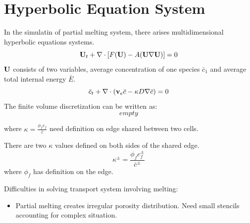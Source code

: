 \section{Hyperbolic Equation System}
In the simulatin of partial melting system, 
there arises multidimensional hyperbolic equations systems.
\begin{equation*}
		  \bold{U}_t + \nabla \cdot [F(\bold{U}) - A(\bold{U} \nabla \bold{U})] = 0
\end{equation*}
$\bold{U}$ consists of two variables, average concentration of one species $\bar{c}_1$ and 
average total internal energy $\bar{E}$.
\begin{equation*}
		  \bar{c}_t + \nabla \cdot (\bold{v}_e \bar{c} - \kappa D \nabla \bar{c}) = 0
\end{equation*}
The finite volume discretization can be written as:
$$empty$$

where $\kappa = \frac{\phi_f c_f}{\bar{c}}$ need definition on edge shared between two cells.
\begin{center}
\end{center}
There are two $\kappa$ values defined on both sides of the shared edge.
\begin{equation*}
		  \kappa^{\pm} = \frac{\phi_f c^{\pm}_f}{\bar{c}^{\pm}}
\end{equation*}
where $\phi_f$ has definition on the edge.

Difficulties in solving transport system involving melting:
\begin{itemize}
\item Partial melting creates irregular porosity distribution.
Need small stencils accounting for complex situation.
\end{itemize}
